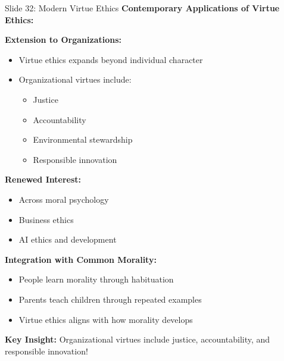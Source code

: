 \documentclass[8pt]{beamer}
\begin{document}
	\begin{frame}{Slide 32: Modern Virtue Ethics}
		\fontsize{6.5}{7.5}\selectfont
		\textbf{Contemporary Applications of Virtue Ethics:}
		
		\vspace{0.1cm}
		\textbf{Extension to Organizations:}
		\begin{itemize}
			\item Virtue ethics expands beyond individual character
			\item Organizational virtues include:
			\begin{itemize}
				\item Justice
				\item Accountability
				\item Environmental stewardship
				\item Responsible innovation
			\end{itemize}
		\end{itemize}
		
		\vspace{0.1cm}
		\textbf{Renewed Interest:}
		\begin{itemize}
			\item Across moral psychology
			\item Business ethics
			\item AI ethics and development
		\end{itemize}
		
		\vspace{0.1cm}
		\textbf{Integration with Common Morality:}
		\begin{itemize}
			\item People learn morality through habituation
			\item Parents teach children through repeated examples
			\item Virtue ethics aligns with how morality develops
		\end{itemize}
		
		\textcolor{myblue}{\textbf{Key Insight:}} Organizational virtues include \textcolor{myblue}{justice, accountability, and responsible innovation}!
	\end{frame}
	
\end{document}
